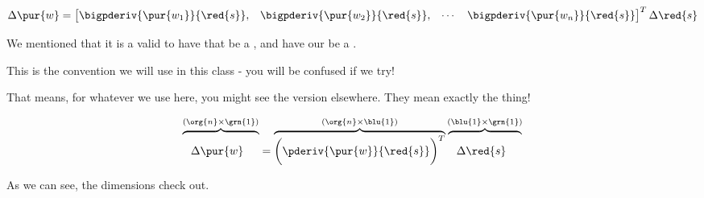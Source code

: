         \begin{equation}
            \Delta \pur{w}
            =
                \begin{bmatrix}
                    \bigpderiv{ \pur{w_1} }{ \red{s} }, &
                    \bigpderiv{ \pur{w_2} }{ \red{s} }, &
                    \cdots &
                    \bigpderiv{ \pur{w_n} }{ \red{s} } 
                \end{bmatrix}
            ^T
            \Delta \red{s}
        \end{equation}
        
        \begin{clarification}
            We mentioned that it is a valid  to have that  be a , and have our  be a .
            
            This is  the convention we will use in this class - you will be confused if we try!
            
            That means, for whatever  we use here, you might see the  version elsewhere. They mean exactly the  thing!
        \end{clarification}
        
        \begin{equation}
            \overbrace{
                \phantom{\bigg(}
                    \Delta \pur{w}
                \phantom{\bigg)^T}
            }^{ (\org{n} \times \grn{1}) }
            =
            \overbrace{
                \bigg(
                    \pderiv{ \pur{w} }{ \red{s} } 
                \bigg)^T
            }^{ (\org{n} \times \blu{1}) }
            \overbrace{
                \phantom{\bigg(}
                    \Delta \red{s}
                \phantom{\bigg)^T}
            }^{ (\blu{1} \times \grn{1}) }
        \end{equation}
        
        As we can see, the dimensions check out.\\
        
